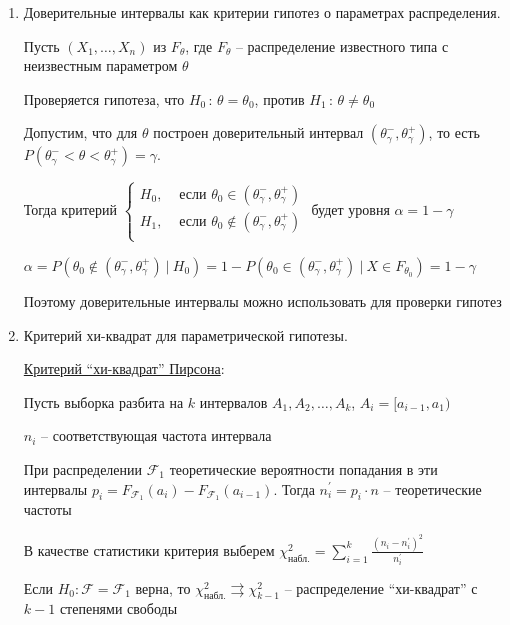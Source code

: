\begin{enumerate}
    Аналогично получаем $t_\text{кр}$ -- квантиль распределения $T_{n - 1}$ уровня $1 - \frac{\alpha}{2}$

    \item Доверительные интервалы как критерии гипотез о параметрах распределения.

    Пусть $(X_1, \dots, X_n)$ из $F_\theta$, где $F_\theta$ -- распределение известного типа с неизвестным параметром $\theta$

    Проверяется гипотеза, что $H_0 \, : \, \theta = \theta_0$, против $H_1 \, : \, \theta \neq \theta_0$

    Допустим, что для $\theta$ построен доверительный интервал $(\theta_\gamma^-, \theta_\gamma^+)$, то есть 
    $P(\theta_\gamma^- < \theta < \theta_\gamma^+) = \gamma$.

    Тогда критерий 
    $\begin{cases}
        H_0, & \text{ если } \theta_0 \in (\theta_\gamma^-, \theta_\gamma^+) \\ 
        H_1, & \text{ если } \theta_0 \not\in (\theta_\gamma^-, \theta_\gamma^+) \\ 
    \end{cases}$ будет уровня $\alpha = 1 - \gamma$

    $\alpha = P(\theta_0 \not\in (\theta_\gamma^-, \theta_\gamma^+) \ | \ H_0) = 1 - P(\theta_0 \in (\theta_\gamma^-, \theta_\gamma^+) \ | \ X \in F_{\theta_0}) = 1 - \gamma$

    Поэтому доверительные интервалы можно использовать для проверки гипотез

    \item Критерий хи-квадрат для параметрической гипотезы.

    \hyperlink{chi_square_criterion}{Критерий \enquote{хи-квадрат} Пирсона}:

    Пусть выборка разбита на $k$ интервалов $A_1, A_2, \dots, A_k$, $A_i = [a_{i - 1}, a_1)$

    $n_i$ -- соответствующая частота интервала

    При распределении $\mathcal{F}_1$ теоретические вероятности попадания в эти интервалы $p_i = F_{\mathcal{F}_1}(a_i) - F_{\mathcal{F}_1}(a_{i - 1})$.
    Тогда $n_i^\prime = p_i \cdot n$ -- теоретические частоты

    В качестве статистики критерия выберем $\chi^2_\text{набл.} = \sum_{i = 1}^k \frac{(n_i - n_i^\prime)^2}{n_i^\prime}$

    \begin{MyTheorem}
         Если $H_0 : \mathcal{F} = \mathcal{F}_1$ верна, то $\chi^2_\text{набл.} \rightrightarrows \chi^2_{k - 1}$ -- 
        распределение \enquote{хи-квадрат} с $k - 1$ степенями свободы
    \end{MyTheorem}


\end{enumerate}
